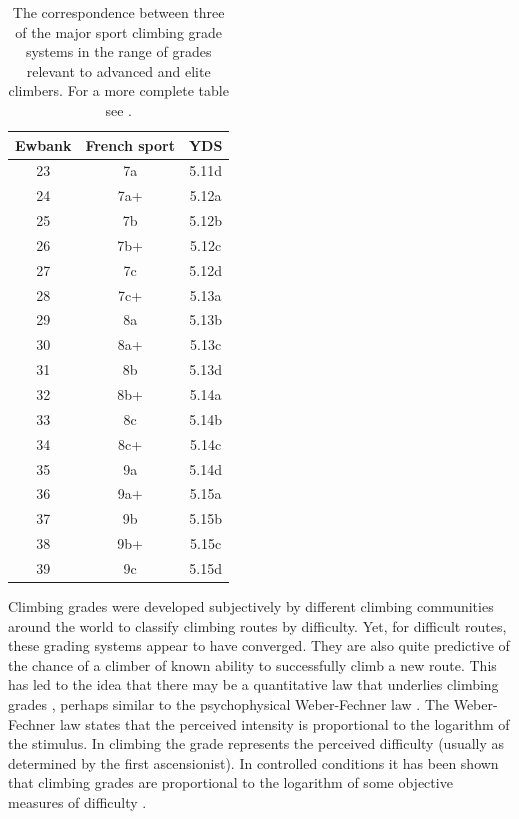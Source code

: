 \documentclass{article}
\begin{document}
\begin{table}
\centering
\begin{tabular}{| c | c | c |}
  \hline			
  {\bf Ewbank} & {\bf French sport} & {\bf YDS} \\
  \hline			
  23 & 7a & 5.11d \\
  24 & 7a+ & 5.12a \\
  25 & 7b & 5.12b \\
  26 & 7b+ & 5.12c \\
  27 & 7c & 5.12d \\
  28 & 7c+ & 5.13a \\
  29 & 8a & 5.13b \\
  30 & 8a+ & 5.13c \\
  31 & 8b & 5.13d \\
  32 & 8b+ & 5.14a \\
  33 & 8c & 5.14b \\
  34 & 8c+ & 5.14c \\
  35 & 9a & 5.14d \\
  36 & 9a+ & 5.15a \\
  37 & 9b & 5.15b \\
  38 & 9b+ & 5.15c \\
  39 & 9c & 5.15d \\
  \hline  
\end{tabular}
\caption{The correspondence between three of the major sport climbing grade systems in the range of grades relevant to advanced and elite climbers. For a more complete table see \cite{draper2015comparative}. }
\label{table1}
\end{table}

Climbing grades were developed subjectively by different climbing communities around the world to classify climbing routes by difficulty. Yet, for difficult routes, these grading systems appear to have converged. They are also quite predictive of the chance of a climber of known ability to successfully climb a new route. This has led to the idea that there may be a quantitative law that underlies climbing grades \cite{delignieres1993psychophysical}, perhaps similar to the psychophysical Weber-Fechner law \cite{1834pulsu,fechner1860}. The Weber-Fechner law states that the perceived intensity is proportional to the logarithm of the stimulus. In climbing the grade represents the perceived difficulty (usually as determined by the first ascensionist). In controlled conditions it has been shown that climbing grades are proportional to the logarithm of some objective measures of difficulty \cite{delignieres1993psychophysical}. 
\end{document}
